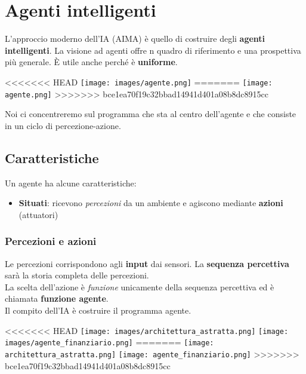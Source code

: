 \newpage
\section{Agenti intelligenti}
L'approccio moderno dell'IA (AIMA) è quello di costruire degli \textbf{agenti intelligenti}. La visione ad agenti offre n quadro di riferimento e una prospettiva più generale. È utile anche perché è \textbf{uniforme}.
\begin{center}
<<<<<<< HEAD
	\texttt{[image: images/agente.png]}
=======
	\texttt{[image: agente.png]}
>>>>>>> bce1ea70f19c32bbad14941d401a08b8dc8915cc
\end{center}
Noi ci concentreremo sul programma che sta al centro dell'agente e che consiste in un ciclo di percezione-azione.
\subsection{Caratteristiche}
Un agente ha alcune caratteristiche:
\begin{itemize}
	\item \textbf{Situati}: ricevono \emph{percezioni} da un ambiente e agiscono mediante \textbf{azioni} (attuatori)
	
\end{itemize}

\subsubsection{Percezioni e azioni}
Le percezioni corrispondono agli \textbf{input} dai sensori. La \textbf{sequenza percettiva} sarà la storia completa delle percezioni.\\
La scelta dell'azione è \emph{funzione} unicamente della sequenza percettiva ed è chiamata \textbf{funzione agente}.\\
Il compito dell'IA è costruire il programma agente.
\begin{center}
<<<<<<< HEAD
	\texttt{[image: images/architettura\_astratta.png]}
	\texttt{[image: images/agente\_finanziario.png]}
=======
	\texttt{[image: architettura\_astratta.png]}
	\texttt{[image: agente\_finanziario.png]}
>>>>>>> bce1ea70f19c32bbad14941d401a08b8dc8915cc
\end{center}

